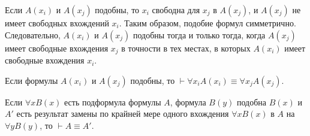 Если $A(x_i)$ и $A(x_j)$ подобны, то $x_i$ свободна для $x_j$ в $A(x_j)$, и $A(x_j)$ не имеет свободных вхождений $x_i$. Таким образом, подобие формул симметрично. Следовательно, $A(x_i)$ и $A(x_j)$ подобны тогда и только тогда, когда $A(x_j)$ имеет свободные вхождения $x_j$ в точности в тех местах, в которых $A(x_i)$ имеет свободные вхождения $x_i$.
\begin{lemma}
    Если формулы $A(x_i)$ и $A(x_j)$ подобны, то $\vdash \forall x_iA(x_i) \equiv \forall x_jA(x_j)$.
\end{lemma}
\begin{corollary}
    Если $\forall xB(x)$ есть подформула формулы $A$, формула $B(y)$ подобна $B(x)$ и $A'$ есть результат замены по крайней мере одного вхождения $\forall xB(x)$ в $A$ на $\forall yB(y)$, то $\vdash A \equiv A'$.
\end{corollary}


